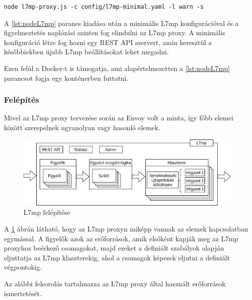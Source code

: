 \begin{lstlisting}[caption=L7mp indítása Node.js segítségével, label=lst:nodeL7mp]
node l7mp-proxy.js -c config/l7mp-minimal.yaml -l warn -s
\end{lstlisting}

A \ref{lst:nodeL7mp} parancs kiadása után a minimális L7mp konfigurációval és a 
figyelmeztetés naplózási szinten fog elindulni az L7mp proxy. A minimális konfiguráció 
létre fog hozni egy REST API szervert, amin keresztül a későbbiekben újabb L7mp 
beállításokat lehet megadni.

Ezen felül a Docker-t is támogatja, ami alapértelmezetten a \ref{lst:nodeL7mp} parancsot 
fogja egy konténerben futtatni.

\subsubsection{Felépítés}

Mivel az L7mp proxy tervezése során az Envoy volt a minta, így főbb elemei között 
szerepelnek ugyanolyan vagy hasonló elemek. 

\begin{figure}[!ht]
	\centering
	\includegraphics[width=1\textwidth, keepaspectratio]{figures/l7mp_struct.png}
	\caption{L7mp felépítése}
	\label{fig:l7mpStruct}
\end{figure}

A \ref{fig:l7mpStruct} ábrán látható, hogy az L7mp proxyn miképp vannak az elemek kapcsolatban egymással. A figyelők azok az erőforrások, amik elsőként kapják meg az L7mp proxyhoz beérkező csomagokat, majd ezeket a definiált szabályok alapján eljuttatja az L7mp klaszterekig, ahol a csomagok képesek eljutni a definiált végpontokig. 

Az alábbi felsorolás tartalmazza az L7mp proxy által használt erőforrások ismertetését.

